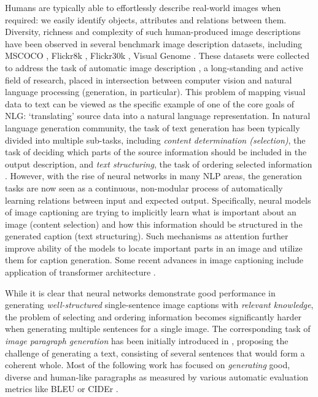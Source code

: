 \documentclass[11pt,a4paper]{article}
\begin{document}
\iffalse
Humans are typically able to effortlessly describe real-world images when required: we easily identify objects, attributes and relations between them.
Diversity, richness and complexity of such human-produced image descriptions have been observed in several benchmark image description datasets, including MSCOCO \cite{lin2014microsoft,chen2015microsoft}, Flickr8k \cite{hodosh2013}, Flickr30k \cite{young-etal-2014-image}, Visual Genome \cite{krishnavisualgenome}.
These datasets were collected to address the task of automatic image description \cite{bernardi2016automatic}, a long-standing and active field of research, placed in intersection between computer vision and natural language processing (generation, in particular).
This problem of mapping visual data to text can be viewed as the specific example of one of the core goals of NLG: `translating' source data into a natural language representation.
In natural language generation community, the task of text generation has been typically divided into multiple sub-tasks, including \textit{content determination (selection)}, the task of deciding which parts of the source information should be included in the output description, and \textit{text structuring}, the task of ordering selected information \cite{Gatt2017}.
However, with the rise of neural networks in many NLP areas, the generation tasks are now seen as a continuous, non-modular process of automatically learning relations between input and expected output. Specifically, neural models of image captioning \cite{kiros14,vinyals2014tell} are trying to implicitly learn what is important about an image (content selection) and how this information should be structured in the generated caption (text structuring).
Such mechanisms as attention \cite{xu2015attend,anderson2017bottomup} further improve ability of the models to locate important parts in an image and utilize them for caption generation. Some recent advances in image captioning include application of transformer architecture \cite{vaswani2017attention,herdade2019image}.


While it is clear that neural networks demonstrate good performance in generating \textit{well-structured} single-sentence image captions with \textit{relevant knowledge}, the problem of selecting and ordering information becomes significantly harder when generating multiple sentences for a single image. The corresponding task of
\textit{image paragraph generation} has been initially introduced in , proposing the challenge of generating a text, consisting of several sentences that would form a coherent whole.
Most of the following work \cite{liang2017recurrent,chatterjee2018diverse,wang2019convolutional} has focused on \textit{generating} good, diverse and human-like paragraphs as measured by various automatic evaluation metrics like BLEU \cite{bleu} or CIDEr \cite{vedantam2014cider}.
\end{document}
